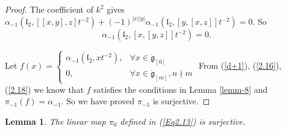 \documentclass[1p]{elsarticle}
\numberwithin{equation}{section}
\def\dg{\dot{\mathfrak{g}}}
\def\fl{\mathfrak{l}}
\newtheorem{lemm}[theo]{Lemma}
\begin{document}
\begin{proof}
The coefficient of $k^2$ gives $\alpha_{-1}(\fl_2,[[x,y],z]t^{-2})+(-1)^{|x||y|}\alpha_{-1}(\fl_2,[y,[x,z]]t^{-2})=0$. So \begin{equation}\label{2.18}\alpha_{-1}(\fl_2,[x,[y,z]]t^{-2})=0.\end{equation}

Let $f(x)=\left\{\begin{array}{ll}\alpha_{-1}(\fl_2, xt^{-2}),&\forall x\in \dg_{[0]}\\ 0, &\forall x\in \dg_{[m]}, n\nmid m\end{array}\right.$  From (\ref{d+1}), (\ref{2.16}), (\ref{2.18}) we know that $f$ satisfies the conditions in Lemma \ref{lemm-8} and $\pi_{-1}(f)=\alpha_{-1}$. So we have proved $\pi_{-1}$ is surjective.
\end{proof}

 \begin{lemm}\label{lemm-10}The linear map  $\pi_0$  defined in (\ref{Eq2.13}) is surjective.\end{lemm}%
\end{document}
